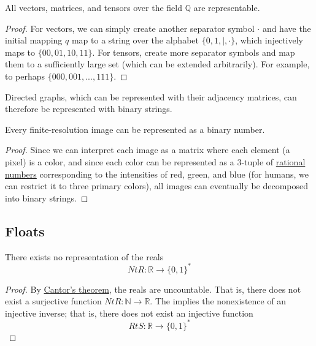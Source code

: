   \begin{theorem}
    \label{thm:representation-of-vectors}
    All vectors, matrices, and tensors over the field $\mathbb{Q}$ are representable. 
  \end{theorem}
  \begin{proof}
    For vectors, we can simply create another separator symbol $\cdot$ and have the initial mapping $q$ map to a string over the alphabet $\{0, 1, |, \cdot\}$, which injectively maps to $\{00, 01, 10, 11\}$. 
    For tensors, create more separator symbols and map them to a sufficiently large set (which can be extended arbitrarily). For example, to perhaps $\{000, 001, ..., 111\}$. 

  \end{proof}

  \begin{corollary}
    \label{thm:representation-of-graphs}
    Directed graphs, which can be represented with their adjacency matrices, can therefore be represented with binary strings. 
  \end{corollary}

  \begin{theorem}
    \label{thm:representation-of-images}
    Every finite-resolution image can be represented as a binary number. 
  \end{theorem}
  \begin{proof}
    Since we can interpret each image as a matrix where each element (a pixel) is a color, and since each color can be represented as a 3-tuple of \hyperref[alg-def:rational-numbers]{rational numbers} corresponding to the intensities of red, green, and blue (for humans, we can restrict it to three primary colors), all images can eventually be decomposed into binary strings. 
  \end{proof}

\subsection{Floats} 

  \begin{theorem}
    \label{thm:representation-of-reals}
    There exists no representation of the reals
    \begin{equation}
      NtR: \mathbb{R} \to \{0, 1\}^\ast
    \end{equation}
  \end{theorem}
  \begin{proof}
    By \hyperref[st-thm:cantors-theorem]{Cantor's theorem}, the reals are uncountable. That is, there does not exist a surjective function $NtR: \mathbb{N} \to \mathbb{R}$. The implies the nonexistence of an injective inverse; that is, there does not exist an injective function 
    \begin{equation}
      RtS: \mathbb{R} \to \{0,1\}^\ast
    \end{equation}
  \end{proof}

